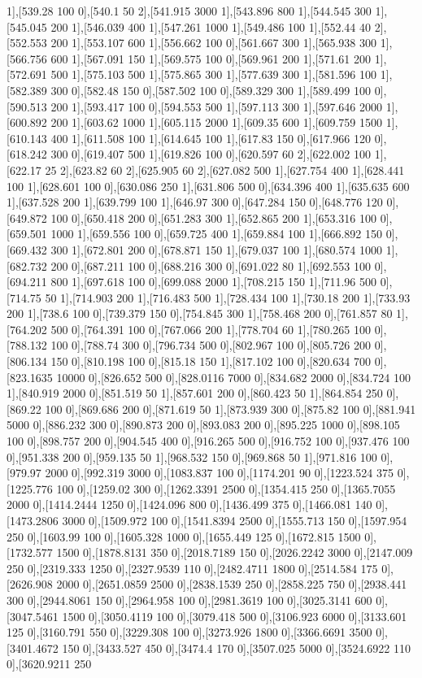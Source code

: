 {1],[539.28 100 0],[540.1 50 2],[541.915 3000 1],[543.896 800 1],[544.545 300 1],[545.045 200 1],[546.039 400 1],[547.261 1000 1],[549.486 100 1],[552.44 40 2],[552.553 200 1],[553.107 600 1],[556.662 100 0],[561.667 300 1],[565.938 300 1],[566.756 600 1],[567.091 150 1],[569.575 100 0],[569.961 200 1],[571.61 200 1],[572.691 500 1],[575.103 500 1],[575.865 300 1],[577.639 300 1],[581.596 100 1],[582.389 300 0],[582.48 150 0],[587.502 100 0],[589.329 300 1],[589.499 100 0],[590.513 200 1],[593.417 100 0],[594.553 500 1],[597.113 300 1],[597.646 2000 1],[600.892 200 1],[603.62 1000 1],[605.115 2000 1],[609.35 600 1],[609.759 1500 1],[610.143 400 1],[611.508 100 1],[614.645 100 1],[617.83 150 0],[617.966 120 0],[618.242 300 0],[619.407 500 1],[619.826 100 0],[620.597 60 2],[622.002 100 1],[622.17 25 2],[623.82 60 2],[625.905 60 2],[627.082 500 1],[627.754 400 1],[628.441 100 1],[628.601 100 0],[630.086 250 1],[631.806 500 0],[634.396 400 1],[635.635 600 1],[637.528 200 1],[639.799 100 1],[646.97 300 0],[647.284 150 0],[648.776 120 0],[649.872 100 0],[650.418 200 0],[651.283 300 1],[652.865 200 1],[653.316 100 0],[659.501 1000 1],[659.556 100 0],[659.725 400 1],[659.884 100 1],[666.892 150 0],[669.432 300 1],[672.801 200 0],[678.871 150 1],[679.037 100 1],[680.574 1000 1],[682.732 200 0],[687.211 100 0],[688.216 300 0],[691.022 80 1],[692.553 100 0],[694.211 800 1],[697.618 100 0],[699.088 2000 1],[708.215 150 1],[711.96 500 0],[714.75 50 1],[714.903 200 1],[716.483 500 1],[728.434 100 1],[730.18 200 1],[733.93 200 1],[738.6 100 0],[739.379 150 0],[754.845 300 1],[758.468 200 0],[761.857 80 1],[764.202 500 0],[764.391 100 0],[767.066 200 1],[778.704 60 1],[780.265 100 0],[788.132 100 0],[788.74 300 0],[796.734 500 0],[802.967 100 0],[805.726 200 0],[806.134 150 0],[810.198 100 0],[815.18 150 1],[817.102 100 0],[820.634 700 0],[823.1635 10000 0],[826.652 500 0],[828.0116 7000 0],[834.682 2000 0],[834.724 100 1],[840.919 2000 0],[851.519 50 1],[857.601 200 0],[860.423 50 1],[864.854 250 0],[869.22 100 0],[869.686 200 0],[871.619 50 1],[873.939 300 0],[875.82 100 0],[881.941 5000 0],[886.232 300 0],[890.873 200 0],[893.083 200 0],[895.225 1000 0],[898.105 100 0],[898.757 200 0],[904.545 400 0],[916.265 500 0],[916.752 100 0],[937.476 100 0],[951.338 200 0],[959.135 50 1],[968.532 150 0],[969.868 50 1],[971.816 100 0],[979.97 2000 0],[992.319 3000 0],[1083.837 100 0],[1174.201 90 0],[1223.524 375 0],[1225.776 100 0],[1259.02 300 0],[1262.3391 2500 0],[1354.415 250 0],[1365.7055 2000 0],[1414.2444 1250 0],[1424.096 800 0],[1436.499 375 0],[1466.081 140 0],[1473.2806 3000 0],[1509.972 100 0],[1541.8394 2500 0],[1555.713 150 0],[1597.954 250 0],[1603.99 100 0],[1605.328 1000 0],[1655.449 125 0],[1672.815 1500 0],[1732.577 1500 0],[1878.8131 350 0],[2018.7189 150 0],[2026.2242 3000 0],[2147.009 250 0],[2319.333 1250 0],[2327.9539 110 0],[2482.4711 1800 0],[2514.584 175 0],[2626.908 2000 0],[2651.0859 2500 0],[2838.1539 250 0],[2858.225 750 0],[2938.441 300 0],[2944.8061 150 0],[2964.958 100 0],[2981.3619 100 0],[3025.3141 600 0],[3047.5461 1500 0],[3050.4119 100 0],[3079.418 500 0],[3106.923 6000 0],[3133.601 125 0],[3160.791 550 0],[3229.308 100 0],[3273.926 1800 0],[3366.6691 3500 0],[3401.4672 150 0],[3433.527 450 0],[3474.4 170 0],[3507.025 5000 0],[3524.6922 110 0],[3620.9211 250 }
